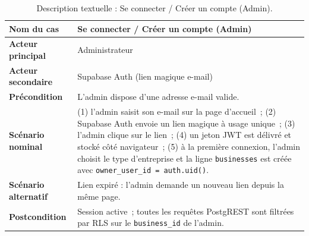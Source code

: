 \begin{table}[H]
  \centering\small
  \caption{Description textuelle : Se connecter / Créer un compte (Admin).}
  \label{tab:uc-s1-login-admin}
  \renewcommand{\arraystretch}{1.45}
  \begin{tabular}{|p{3.0cm}|>{\raggedright\arraybackslash}p{10.8cm}|}
    \hline\hline
    \textbf{Nom du cas} & Se connecter / Créer un compte (Admin) \\
    \hline
    \textbf{Acteur principal} & Administrateur \\
    \hline
    \textbf{Acteur secondaire} & Supabase Auth (lien magique e-mail) \\
    \hline
    \textbf{Précondition} & L'admin dispose d'une adresse e-mail valide. \\
    \hline
    \textbf{Scénario nominal} &
      (1) l'admin saisit son e-mail sur la page d'accueil~;
      (2) Supabase Auth envoie un lien magique à usage unique~;
      (3) l'admin clique sur le lien~;
      (4) un jeton JWT est délivré et stocké côté navigateur~;
      (5) à la première connexion, l'admin choisit le type d'entreprise
          et la ligne \texttt{businesses} est créée avec
      \texttt{owner\_user\_id = auth.uid()}. \\
      \hline
    \textbf{Scénario alternatif} & Lien expiré : l'admin demande un
      nouveau lien depuis la même page. \\
      \hline
    \textbf{Postcondition} & Session active~; toutes les requêtes
      PostgREST sont filtrées par RLS sur le \texttt{business\_id}
      de l'admin. \\
    \hline\hline
  \end{tabular}
\end{table}

